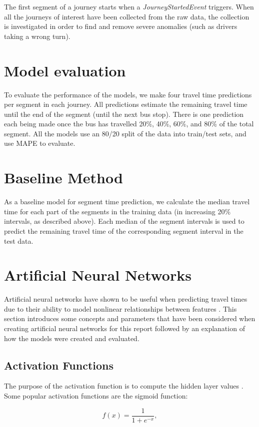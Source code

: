 The first segment of a journey starts when a \textit{JourneyStartedEvent} triggers. When all the journeys of interest have been collected from the raw data, the collection is investigated in order to find and remove severe anomalies (such as drivers taking a wrong turn). 

\section{Model evaluation}
To evaluate the performance of the models, we make four travel time predictions per segment in each journey. All predictions estimate the remaining travel time until the end of the segment (until the next bus stop). There is one prediction each being made once the bus has travelled 20\%, 40\%, 60\%, and 80\% of the total segment. All the models use an 80/20 split of the data into train/test sets, and use MAPE to evaluate.

\section{Baseline Method}
As a baseline model for segment time prediction, we calculate the median travel time for each part of the segments in the training data (in increasing 20\% intervals, as described above). Each median of the segment intervals is used to predict the remaining travel time of the corresponding segment interval in the test data.

\section{Artificial Neural Networks}

Artificial neural networks have shown to be useful when predicting travel times due to their ability to model nonlinear relationships between features \cite{brazilANN}\cite{malaysiaANN}. This section introduces some concepts and parameters that have been considered when creating artificial neural networks for this report followed by an explanation of how the models were created and evaluated.

\subsection{Activation Functions}
The purpose of the activation function is to compute the hidden layer values \cite{Goodfellow-et-al-2016}. Some popular activation functions are the sigmoid function:

\begin{equation} 
    f(x) = \frac{1}{1+e^{-x}},
\end{equation}

